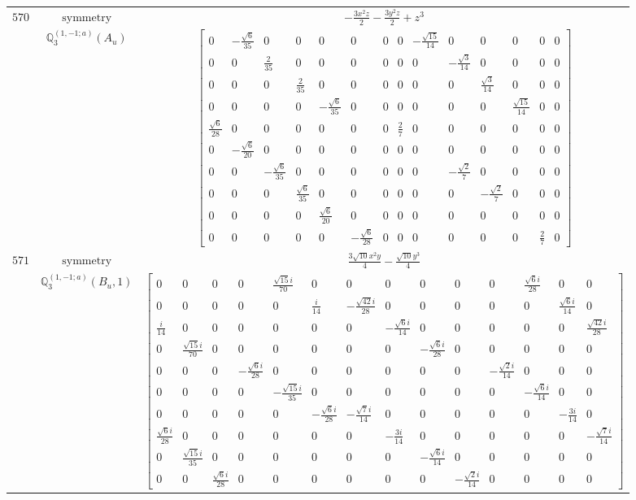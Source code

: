 \documentclass[fleqn,8pt,landscape]{jsarticle}
\begin{document}
\begin{longtable}{ccc}
$ 570 $ & $ \text{symmetry} $ & $ - \frac{3 x^{2} z}{2} - \frac{3 y^{2} z}{2} + z^{3} $ \\
$  $ & $ \mathbb{Q}_{3}^{(1,-1;a)}(A_{u}) $ & $ \begin{bmatrix} 0 & - \frac{\sqrt{6}}{35} & 0 & 0 & 0 & 0 & 0 & 0 & - \frac{\sqrt{15}}{14} & 0 & 0 & 0 & 0 & 0 \\ 0 & 0 & \frac{2}{35} & 0 & 0 & 0 & 0 & 0 & 0 & - \frac{\sqrt{3}}{14} & 0 & 0 & 0 & 0 \\ 0 & 0 & 0 & \frac{2}{35} & 0 & 0 & 0 & 0 & 0 & 0 & \frac{\sqrt{3}}{14} & 0 & 0 & 0 \\ 0 & 0 & 0 & 0 & - \frac{\sqrt{6}}{35} & 0 & 0 & 0 & 0 & 0 & 0 & \frac{\sqrt{15}}{14} & 0 & 0 \\ \frac{\sqrt{6}}{28} & 0 & 0 & 0 & 0 & 0 & 0 & \frac{2}{7} & 0 & 0 & 0 & 0 & 0 & 0 \\ 0 & - \frac{\sqrt{6}}{20} & 0 & 0 & 0 & 0 & 0 & 0 & 0 & 0 & 0 & 0 & 0 & 0 \\ 0 & 0 & - \frac{\sqrt{6}}{35} & 0 & 0 & 0 & 0 & 0 & 0 & - \frac{\sqrt{2}}{7} & 0 & 0 & 0 & 0 \\ 0 & 0 & 0 & \frac{\sqrt{6}}{35} & 0 & 0 & 0 & 0 & 0 & 0 & - \frac{\sqrt{2}}{7} & 0 & 0 & 0 \\ 0 & 0 & 0 & 0 & \frac{\sqrt{6}}{20} & 0 & 0 & 0 & 0 & 0 & 0 & 0 & 0 & 0 \\ 0 & 0 & 0 & 0 & 0 & - \frac{\sqrt{6}}{28} & 0 & 0 & 0 & 0 & 0 & 0 & \frac{2}{7} & 0 \end{bmatrix} $ \\ \hline
$ 571 $ & $ \text{symmetry} $ & $ \frac{3 \sqrt{10} x^{2} y}{4} - \frac{\sqrt{10} y^{3}}{4} $ \\
$  $ & $ \mathbb{Q}_{3}^{(1,-1;a)}(B_{u},1) $ & $ \begin{bmatrix} 0 & 0 & 0 & 0 & \frac{\sqrt{15} i}{70} & 0 & 0 & 0 & 0 & 0 & 0 & \frac{\sqrt{6} i}{28} & 0 & 0 \\ 0 & 0 & 0 & 0 & 0 & \frac{i}{14} & - \frac{\sqrt{42} i}{28} & 0 & 0 & 0 & 0 & 0 & \frac{\sqrt{6} i}{14} & 0 \\ \frac{i}{14} & 0 & 0 & 0 & 0 & 0 & 0 & - \frac{\sqrt{6} i}{14} & 0 & 0 & 0 & 0 & 0 & \frac{\sqrt{42} i}{28} \\ 0 & \frac{\sqrt{15} i}{70} & 0 & 0 & 0 & 0 & 0 & 0 & - \frac{\sqrt{6} i}{28} & 0 & 0 & 0 & 0 & 0 \\ 0 & 0 & 0 & - \frac{\sqrt{6} i}{28} & 0 & 0 & 0 & 0 & 0 & 0 & - \frac{\sqrt{2} i}{14} & 0 & 0 & 0 \\ 0 & 0 & 0 & 0 & - \frac{\sqrt{15} i}{35} & 0 & 0 & 0 & 0 & 0 & 0 & - \frac{\sqrt{6} i}{14} & 0 & 0 \\ 0 & 0 & 0 & 0 & 0 & - \frac{\sqrt{6} i}{28} & - \frac{\sqrt{7} i}{14} & 0 & 0 & 0 & 0 & 0 & - \frac{3 i}{14} & 0 \\ \frac{\sqrt{6} i}{28} & 0 & 0 & 0 & 0 & 0 & 0 & - \frac{3 i}{14} & 0 & 0 & 0 & 0 & 0 & - \frac{\sqrt{7} i}{14} \\ 0 & \frac{\sqrt{15} i}{35} & 0 & 0 & 0 & 0 & 0 & 0 & - \frac{\sqrt{6} i}{14} & 0 & 0 & 0 & 0 & 0 \\ 0 & 0 & \frac{\sqrt{6} i}{28} & 0 & 0 & 0 & 0 & 0 & 0 & - \frac{\sqrt{2} i}{14} & 0 & 0 & 0 & 0 \end{bmatrix} $ \\ \hline

\end{longtable}
\end{document}
